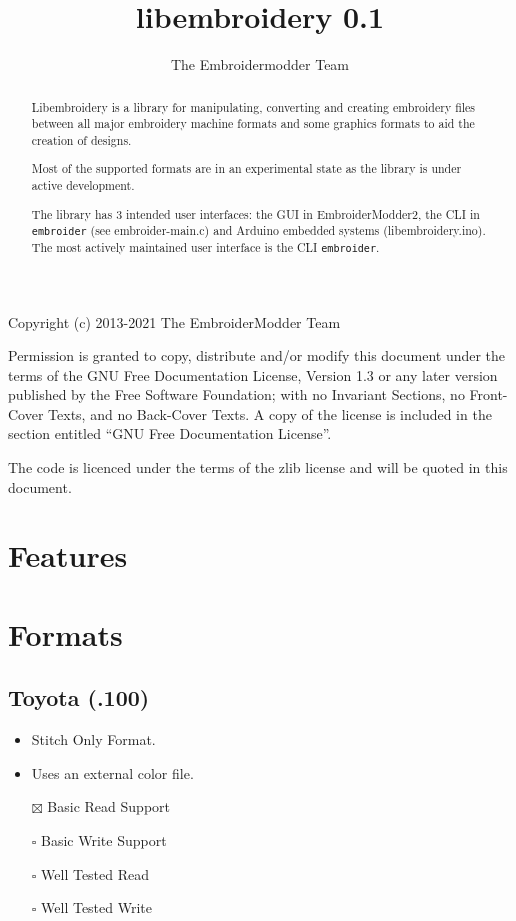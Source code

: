 \documentclass[onesize, a4paper]{refart}
\title{libembroidery 0.1}
\author{The Embroidermodder Team}
\date{}
\providecommand{\tightlist}{\setlength{\itemsep}{0pt}\setlength{\parskip}{0pt}}
\begin{document}
\maketitle

\begin{abstract}
Libembroidery is a library for manipulating, converting and creating
embroidery files between all major embroidery machine formats and some
graphics formats to aid the creation of designs.

Most of the supported formats are in an experimental state as the
library is under active development.

The library has 3 intended user interfaces: the GUI in EmbroiderModder2,
the CLI in \texttt{embroider} (see embroider-main.c) and Arduino
embedded systems (libembroidery.ino). The most actively maintained user
interface is the CLI \texttt{embroider}.
\end{abstract}

\begin{small}
Copyright (c) 2013-2021 The EmbroiderModder Team

Permission is granted to copy, distribute and/or modify this document
under the terms of the GNU Free Documentation License, Version 1.3 or
any later version published by the Free Software Foundation; with no
Invariant Sections, no Front-Cover Texts, and no Back-Cover Texts. A
copy of the license is included in the section entitled ``GNU Free
Documentation License''.

The code is licenced under the terms of the zlib license and will be
quoted in this document.
\end{small}

\tableofcontents

\newpage

\section{Features}

\section{Formats}

\subsection{Toyota (.100)}

\begin{itemize}
\tightlist
\item Stitch Only Format.
\item Uses an external color file.
\item[$\boxtimes$] Basic Read Support
\item[$\square$] Basic Write Support
\item[$\square$] Well Tested Read
\item[$\square$] Well Tested Write
\end{itemize}
\end{document}
